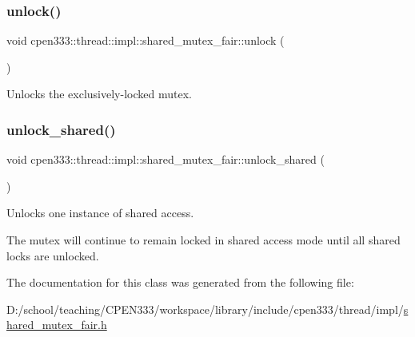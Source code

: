 \subsubsection{\texorpdfstring{unlock()}{unlock()}}
{\footnotesize\ttfamily void cpen333\+::thread\+::impl\+::shared\+\_\+mutex\+\_\+fair\+::unlock (\begin{DoxyParamCaption}{ }\end{DoxyParamCaption})\hspace{0.3cm}{\ttfamily [inline]}}



Unlocks the exclusively-\/locked mutex. 

\mbox{\label{classcpen333_1_1thread_1_1impl_1_1shared__mutex__fair_a9a726de789646d73abf5fb03f7627a0b}} 
\subsubsection{\texorpdfstring{unlock\+\_\+shared()}{unlock\_shared()}}
{\footnotesize\ttfamily void cpen333\+::thread\+::impl\+::shared\+\_\+mutex\+\_\+fair\+::unlock\+\_\+shared (\begin{DoxyParamCaption}{ }\end{DoxyParamCaption})\hspace{0.3cm}{\ttfamily [inline]}}



Unlocks one instance of shared access. 

The mutex will continue to remain locked in shared access mode until all shared locks are unlocked. 

The documentation for this class was generated from the following file\+:\begin{DoxyCompactItemize}
\item 
D\+:/school/teaching/\+C\+P\+E\+N333/workspace/library/include/cpen333/thread/impl/\hyperlink{thread_2impl_2shared__mutex__fair_8h}{shared\+\_\+mutex\+\_\+fair.\+h}\end{DoxyCompactItemize}

